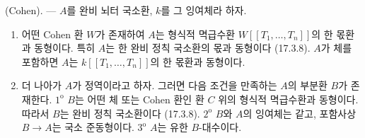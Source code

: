\begin{theorem}[19.8.8]
\label{0.19.8.8-ko}
\textup{(Cohen).} --- $A$를 완비 뇌터 국소환, $k$를 그 잉여체라 하자.


\begin{enumerate}
  \item[(i)] 어떤 Cohen 환 $W$가 존재하여 $A$는 형식적 멱급수환
  $W[[T_1,\ldots,T_n]]$의 한 몫환과 동형이다. 특히 $A$는 한 완비
  정칙 국소환의 몫과 동형이다 (17.3.8). $A$가 체를 포함하면
  $A$는 $k[[T_1,\ldots,T_n]]$의 한 몫환과 동형이다.
  \item[(ii)] 더 나아가 $A$가 정역이라고 하자. 그러면 다음 조건을
  만족하는 $A$의 부분환 $B$가 존재한다. $1^{\mathrm o}$ $B$는 어떤
  체 또는 Cohen 환인 환 $C$ 위의 형식적 멱급수환과 동형이다. 따라서
  $B$는 완비 정칙 국소환이다 (17.3.8). $2^{\mathrm o}$ $B$와 $A$의
  잉여체는 같고, 포함사상 $B\to A$는 국소 준동형이다.
  $3^{\mathrm o}$ $A$는 유한 $B$-대수이다.
\end{enumerate}
\end{theorem}

